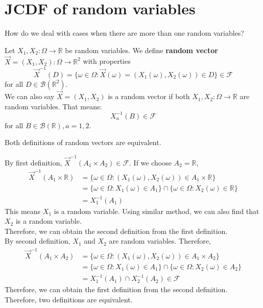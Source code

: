 \documentclass{huhtakm-template-book}
\begin{document}
\section{JCDF of random variables}
How do we deal with cases when there are more than one random variables?
\begin{defn}
	Let $X_{1},X_{2}:\Omega\to\mathbb{R}$ be random variables. We define \textbf{random vector} $\vec{X}=(X_{1},X_{2}):\Omega\to\mathbb{R}^{2}$ with properties
	\begin{equation*}
		\vec{X}^{-1}(D)=\{\omega\in\Omega:\vec{X}(\omega)=(X_{1}(\omega),X_{2}(\omega))\in D\}\in\mathcal{F}
	\end{equation*}
	for all $D\in\mathcal{B}(\mathbb{R}^{2})$.\\
	We can also say $\vec{X}=(X_{1},X_{2})$ is a random vector if both $X_{1},X_{2}:\Omega\to\mathbb{R}$ are random variables. That means:
	\begin{equation*}
		X_{a}^{-1}(B)\in\mathcal{F}
	\end{equation*}
	for all $B\in\mathcal{B}(\mathbb{R}),a=1,2$.
\end{defn}
\begin{cla}
	Both definitions of random vectors are equivalent.
\end{cla}
\begin{proofing}
	By first definition, $\vec{X}^{-1}(A_{1}\times A_{2})\in\mathcal{F}$. If we choose $A_{2}=\mathbb{R}$,
	\begin{align*}
		\vec{X}^{-1}(A_{1}\times \mathbb{R})&=\{\omega\in\Omega:(X_{1}(\omega),X_{2}(\omega))\in A_{1}\times\mathbb{R}\}\\
		&=\{\omega\in\Omega:X_{1}(\omega)\in A_{1}\}\cap\{\omega\in\Omega:X_{2}(\omega)\in\mathbb{R}\}\\
		&=X_{1}^{-1}(A_{1})
	\end{align*}
	This means $X_{1}$ is a random variable. Using similar method, we can also find that $X_{2}$ is a random variable.\\
	Therefore, we can obtain the second definition from the first definition.\\
	By second definition, $X_{1}$ and $X_{2}$ are random variables. Therefore,
	\begin{align*}
		\vec{X}^{-1}(A_{1}\times A_{2})&=\{\omega\in\Omega:(X_{1}(\omega),X_{2}(\omega))\in A_{1}\times A_{2}\}\\
		&=\{\omega\in\Omega:X_{1}(\omega)\in A_{1}\}\cap\{\omega\in\Omega:X_{2}(\omega)\in A_{2}\}\\
		&=X_{1}^{-1}(A_{1})\cap X_{2}^{-1}(A_{2})\in\mathcal{F}
	\end{align*}
	Therefore, we can obtain the first definition from the second definition.\\
	Therefore, two definitions are equivalent.
\end{proofing}
\end{document}
